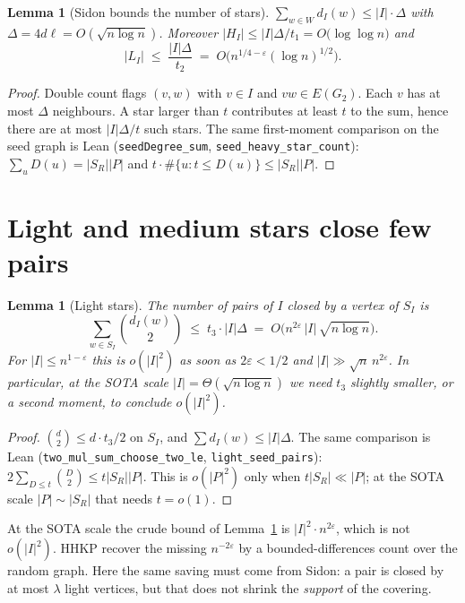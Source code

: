 \documentclass[11pt]{article}
\newtheorem{lemma}[theorem]{Lemma}
\theoremstyle{definition}
\newcommand{\bin}[2]{\binom{#1}{#2}}
\newcommand{\eps}{\varepsilon}
\begin{document}
\begin{lemma}[Sidon bounds the number of stars]\label{lem:nstars}
$\sum_{w\in W}d_I(w)\le |I|\cdot\Delta$ with $\Delta=4d\ell=O(\sqrt{n\log n})$.
Moreover $|H_I|\le |I|\Delta/t_{1}=O\bigl(\log\log n\bigr)$ and
\[
  |L_I|\;\le\;\frac{|I|\Delta}{t_{2}}\;=\;O\bigl(n^{1/4-\eps}(\log n)^{1/2}\bigr).
\]
\end{lemma}

\begin{proof}
Double count flags $(v,w)$ with $v\in I$ and $vw\in E(G_2)$.
Each $v$ has at most $\Delta$ neighbours.
A star larger than $t$ contributes at least $t$ to the sum, hence there are at most $|I|\Delta/t$ such stars.
The same first-moment comparison on the seed graph is Lean
(\texttt{seedDegree\_sum}, \texttt{seed\_heavy\_star\_count}):
$\sum_u D(u)=|S_R||P|$ and $t\cdot\#\{u:t\le D(u)\}\le|S_R||P|$.
\end{proof}

\section{Light and medium stars close few pairs}

\begin{lemma}[Light stars]\label{lem:light}
The number of pairs of $I$ closed by a vertex of $S_I$ is
\[
  \sum_{w\in S_I}\bin{d_I(w)}{2}
  \;\le\;
  t_{3}\cdot|I|\Delta
  \;=\;
  O\bigl(n^{2\eps}\,|I|\,\sqrt{n\log n}\bigr).
\]
For $|I|\le n^{1-\eps}$ this is $o(|I|^{2})$ as soon as $2\eps<1/2$ and $|I|\gg\sqrt{n}\,n^{2\eps}$.
In particular, at the SOTA scale $|I|=\Theta(\sqrt{n\log n})$ we need $t_{3}$ slightly smaller, or a second moment, to conclude $o(|I|^{2})$.
\end{lemma}

\begin{proof}
$\bin{d}{2}\le d\cdot t_{3}/2$ on $S_I$, and $\sum d_I(w)\le|I|\Delta$.
The same comparison is Lean (\texttt{two\_mul\_sum\_choose\_two\_le},
\texttt{light\_seed\_pairs}):
$2\sum_{D\le t}\bin{D}{2}\le t|S_R||P|$.
This is $o(|P|^{2})$ only when $t|S_R|\ll|P|$; at the SOTA scale
$|P|\sim|S_R|$ that needs $t=o(1)$.
\end{proof}

At the SOTA scale the crude bound of Lemma~\ref{lem:light} is $|I|^{2}\cdot n^{2\eps}$, which is not $o(|I|^{2})$.
HHKP recover the missing $n^{-2\eps}$ by a bounded-differences count over the random graph.
Here the same saving must come from Sidon: a pair is closed by at most $\lambda$ light vertices, but that does not shrink the \emph{support} of the covering.
\end{document}
